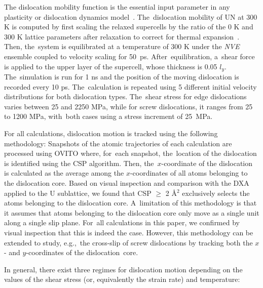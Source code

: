 \documentclass[applsci,article,accept,pdftex,moreauthors]{Definitions/mdpi}
\newcommand{\?}{\stackrel{?}{=}}
\begin{document}
The dislocation mobility function is the essential input parameter in any plasticity or dislocation dynamics model~\cite{Kaloni2023}. The~dislocation mobility of UN at 300 K is computed by first scaling the relaxed supercells by the ratio of the 0 K and 300 K lattice parameters after relaxation to correct for thermal expansion~\cite{Cho2017}. Then, the~system is equilibrated at a temperature of 300 K under the \textit{NVE} ensemble coupled to velocity scaling for 50~ps. After~equilibration, a~shear force is applied to the upper layer of the supercell, whose thickness is 0.05 $l_y$. The~simulation is run for 1 ns and the position of the moving dislocation is recorded every 10 ps. The~calculation is repeated using 5 different initial velocity distributions for both dislocation types. The~shear stress for edge dislocations varies between 25 and 2250 MPa, while for screw dislocations, it ranges from 25 to 1200 MPa, with~both cases using a stress increment of 25~MPa.

For all calculations, dislocation motion is tracked using the following methodology: Snapshots of the atomic trajectories of each calculation are processed using OVITO where, for~each snapshot, the~location of the dislocation is identified using the CSP algorithm. Then, the~$x$-coordinate of the dislocation is calculated as the average among the $x$-coordinates of all atoms belonging to the dislocation core. Based on visual inspection and comparison with the DXA applied to the U sublattice, we found that CSP $\geq$ 2 \AA$^2$ exclusively selects the atoms belonging to the dislocation core. A~limitation of this methodology is that it assumes that atoms belonging to the dislocation core only move as a single unit %
along a single slip plane. For~all calculations in this paper, we confirmed by visual inspection that this is indeed the case. However, this methodology can be extended to study, e.g.,~the cross-slip of screw dislocations by tracking both the $x$- and $y$-coordinates of the dislocation~core.

In general, there exist three regimes for dislocation motion depending on the values of the shear stress (or, equivalently the strain rate) and temperature:
\end{document}
